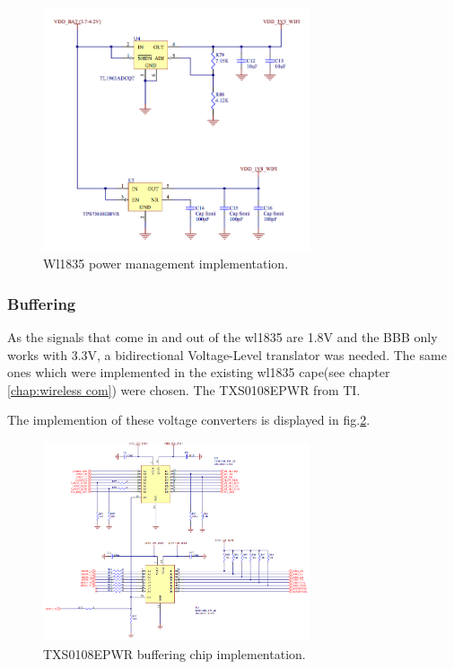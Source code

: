 \begin{figure}[!ht]
    \centering
    \includegraphics[width=0.7\textwidth,keepaspectratio]{chap/hardFig/wl1835_power_sch}
    \caption{Wl1835 power management implementation.}
    \label{fig:power management}
\end{figure}

\subsubsection{Buffering}
As the signals that come in and out of the wl1835 are 1.8V and the BBB only works with 3.3V, a bidirectional Voltage-Level translator was needed. The same ones which were implemented in the existing wl1835 cape(see chapter \ref{chap:wireless com}) were chosen. The TXS0108EPWR from TI.

The implemention of these voltage converters is displayed in fig.\ref{fig:buffering chip}.

\begin{figure}[!ht]
    \centering
    \includegraphics[width=0.7\textwidth,keepaspectratio]{chap/hardFig/wl_1835_buffer_sch}
    \caption{TXS0108EPWR buffering chip implementation.}
    \label{fig:buffering chip}
\end{figure}

